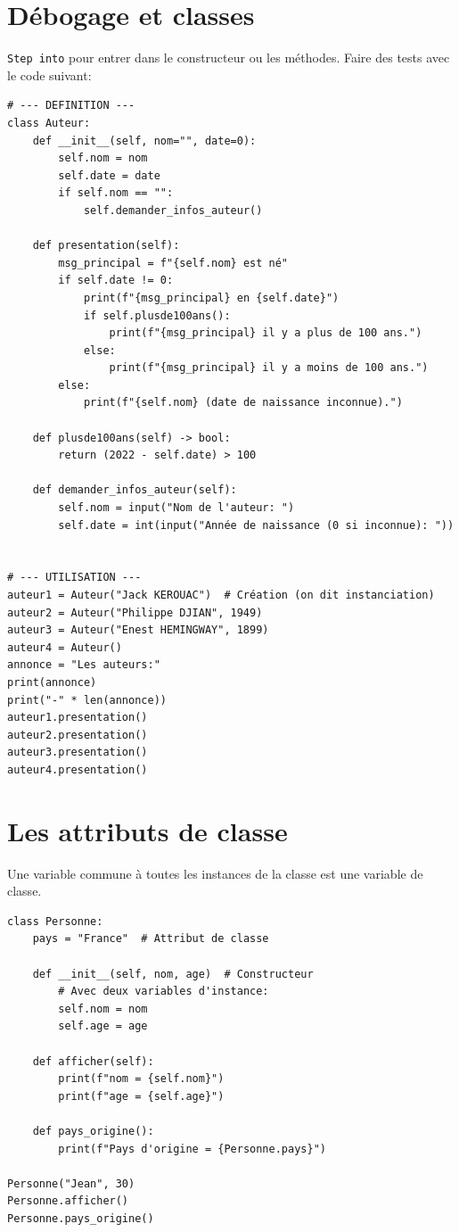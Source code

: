 \documentclass[a4paper,12pt]{book}
\begin{document}
\section{Débogage et classes}
\texttt{Step into} pour entrer dans le constructeur ou les méthodes. Faire des tests avec le code suivant:
\begin{lstlisting}[caption=Pour tester le débogage]
# --- DEFINITION ---
class Auteur:
    def __init__(self, nom="", date=0):
        self.nom = nom
        self.date = date
        if self.nom == "":
            self.demander_infos_auteur()

    def presentation(self):
        msg_principal = f"{self.nom} est né"
        if self.date != 0:
            print(f"{msg_principal} en {self.date}")
            if self.plusde100ans():
                print(f"{msg_principal} il y a plus de 100 ans.")
            else:
                print(f"{msg_principal} il y a moins de 100 ans.")
        else:
            print(f"{self.nom} (date de naissance inconnue).")

    def plusde100ans(self) -> bool:
        return (2022 - self.date) > 100

    def demander_infos_auteur(self):
        self.nom = input("Nom de l'auteur: ")
        self.date = int(input("Année de naissance (0 si inconnue): "))


# --- UTILISATION ---
auteur1 = Auteur("Jack KEROUAC")  # Création (on dit instanciation)
auteur2 = Auteur("Philippe DJIAN", 1949)
auteur3 = Auteur("Enest HEMINGWAY", 1899)
auteur4 = Auteur()
annonce = "Les auteurs:"
print(annonce)
print("-" * len(annonce))
auteur1.presentation()
auteur2.presentation()
auteur3.presentation()
auteur4.presentation()
\end{lstlisting}
\medskip

\section{Les attributs de classe}\label{AttributDeClasse}
Une variable commune à toutes les instances de la classe est une variable de classe.
\begin{lstlisting}[caption=Attribut de classe]
class Personne:
    pays = "France"  # Attribut de classe

    def __init__(self, nom, age)  # Constructeur
    	# Avec deux variables d'instance:
        self.nom = nom
        self.age = age  

    def afficher(self):
        print(f"nom = {self.nom}")
        print(f"age = {self.age}")

    def pays_origine():
        print(f"Pays d'origine = {Personne.pays}")

Personne("Jean", 30)
Personne.afficher()
Personne.pays_origine()
\end{lstlisting}
\medskip
\end{document}

